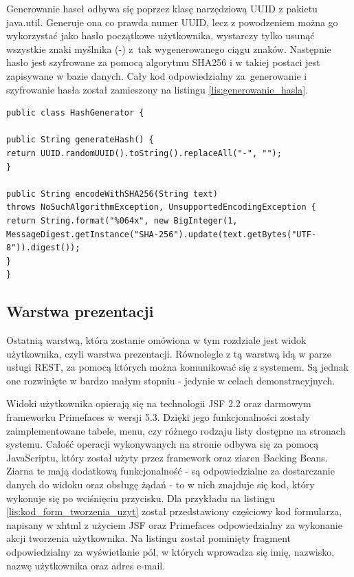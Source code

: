 Generowanie haseł odbywa się poprzez klasę narzędziową UUID z pakietu java.util. Generuje ona co prawda numer UUID, lecz z powodzeniem można go wykorzystać jako hasło początkowe użytkownika, wystarczy tylko usunąć wszystkie znaki myślnika (-) z~tak wygenerowanego ciągu znaków. Następnie hasło jest szyfrowane za pomocą algorytmu SHA256 i w takiej postaci jest zapisywane w bazie danych. Cały kod odpowiedzialny za~generowanie i szyfrowanie hasła został zamieszony na listingu \ref{lis:generowanie_hasla}.

\begin{lstlisting}[caption={Klasa generująca i szyfrująca hasła}, label=lis:generowanie_hasla, numbers=none]
public class HashGenerator {

public String generateHash() {
return UUID.randomUUID().toString().replaceAll("-", "");
}

public String encodeWithSHA256(String text) 
throws NoSuchAlgorithmException, UnsupportedEncodingException {
return String.format("%064x", new BigInteger(1, 
MessageDigest.getInstance("SHA-256").update(text.getBytes("UTF-8")).digest());
}
}\end{lstlisting}

\subsection{Warstwa prezentacji}

Ostatnią warstwą, która zostanie omówiona w tym rozdziale jest widok użytkownika, czyli warstwa prezentacji. Równolegle z tą warstwą idą w parze usługi REST, za pomocą których można komunikować się z systemem. Są jednak one rozwinięte w bardzo małym stopniu - jedynie w celach demonstracyjnych.

Widoki użytkownika opierają się na technologii JSF 2.2 \cite{JSF_CORE} oraz darmowym frameworku Primefaces w wersji 5.3. Dzięki jego funkcjonalności zostały zaimplementowane tabele, menu, czy różnego rodzaju listy dostępne na stronach systemu. Całość operacji wykonywanych na stronie odbywa się za pomocą JavaScriptu, który został użyty przez framework oraz ziaren Backing Beans. Ziarna te mają dodatkową funkcjonalność - są odpowiedzialne za dostarczanie danych do widoku oraz obsługę żądań - to w nich znajduje się kod, który wykonuje się po wciśnięciu przycisku. Dla przykładu na listingu \ref{lis:kod_form_tworzenia_uzyt} został przedstawiony częściowy kod formularza, napisany w xhtml z użyciem JSF oraz Primefaces odpowiedzialny za wykonanie akcji tworzenia użytkownika. Na listingu został pominięty fragment odpowiedzialny za wyświetlanie pól, w których wprowadza się imię, nazwisko, nazwę użytkownika oraz adres e-mail.

